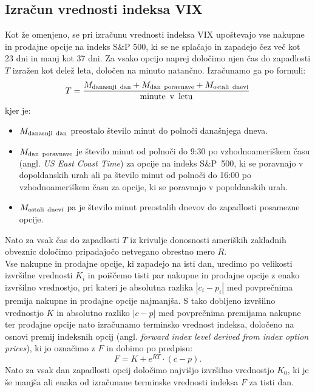 \documentclass[12pt,a4paper, reqno]{amsart}
\theoremstyle{definition} %
\theoremstyle{plain} %
\begin{document}
\subsection{Izračun vrednosti indeksa VIX}
Kot že omenjeno, se pri izračunu vrednosti indeksa VIX upoštevajo vse nakupne in prodajne opcije na indeks S\&P 500, ki se ne splačajo in zapadejo čez več kot 23 dni in manj kot 37 dni.
Za vsako opcijo naprej določimo njen čas do zapadlosti $T$ izražen kot delež leta, določen na minuto natančno. Izračunamo ga po formuli:
$$
T = \frac{M_{\text{danasnji\, dan}} + M_{\text{dan\, poravnave}} + M_{\text{ostali\, dnevi}}} {\text{minute\, v\, letu}}
$$
kjer je:
\begin{itemize}
\item $M_{\text{danasnji\, dan}}$ preostalo število minut do polnoči današnjega dneva.\\

\item $M_{\text{dan\, poravnave}}$ je število minut od polnoči do 9:30 po vzhodnoameriškem času (angl. \textit{US East Coast Time}) za opcije na indeks S\&P~500, ki se poravnajo v dopoldanskih urah ali pa število minut od polnoči do 16:00  po vzhodnoameriškem času za opcije, ki se poravnajo v popoldanskih urah.\\

\item $ M_{\text{ostali\, dnevi}}$ pa je število minut preostalih dnevov do zapadlosti posamezne opcije.
\end{itemize}
Nato za vsak čas do zapadlosti $T$ iz krivulje donosnosti ameriških zakladnih obveznic določimo pripadajočo netvegano obrestno mero $R$.\\

Vse nakupne in prodajne opcije, ki zapadejo na isti dan, uredimo po velikosti izvršilne vrednosti $K_i$ in poiščemo tisti par nakupne in prodajne opcije z enako izvršilno vrednostjo, pri kateri je absolutna razlika $ |c_i - p_i|$ med povprečnima premija nakupne in prodajne opcije najmanjša. S tako dobljeno izvršilno vrednostjo $K$ in absolutno razliko $|c-p|$ med povprečnima premijama nakupne ter prodajne opcije nato izračunamo terminsko vrednost indeksa, določeno na osnovi premij indeksnih opcij (angl. \textit{forward index level derived from index option prices}), ki jo označimo z $F$ in dobimo po predpisu:
$$
F= K + e^{RT} \cdot (c-p).
$$
Nato za vsak dan zapadlosti opcij določimo najvišjo izvršilno vrednostjo $K_0$, ki je še manjša ali enaka od izračunane terminske vrednosti indeksa $F$ za tisti dan.\\
\end{document}
